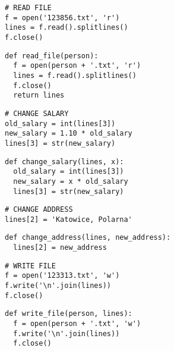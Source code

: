 \documentclass[aspectratio=169]{beamer}
\newcommand{\style}[1]{\ttfamily#1}
\begin{document}
\begin{frame}[fragile]
\begin{lstlisting}[basicstyle=\style{\small}]
# READ FILE
f = open('123856.txt', 'r')
lines = f.read().splitlines()
f.close()
\end{lstlisting}
\vspace{1.5cm}
\begin{lstlisting}[basicstyle=\style{\small}]
def read_file(person):
  f = open(person + '.txt', 'r')
  lines = f.read().splitlines()
  f.close()
  return lines
\end{lstlisting}
\end{frame}

\begin{frame}[fragile]
\begin{lstlisting}[basicstyle=\style{\small}]
# CHANGE SALARY
old_salary = int(lines[3])
new_salary = 1.10 * old_salary
lines[3] = str(new_salary)
\end{lstlisting}
\vspace{1.5cm}
\begin{lstlisting}[basicstyle=\style{\small}]
def change_salary(lines, x):
  old_salary = int(lines[3])
  new_salary = x * old_salary
  lines[3] = str(new_salary)
\end{lstlisting}
\end{frame}

\begin{frame}[fragile]
\begin{lstlisting}[basicstyle=\style{\small}]
# CHANGE ADDRESS
lines[2] = 'Katowice, Polarna'
\end{lstlisting}
\vspace{1.5cm}
\begin{lstlisting}[basicstyle=\style{\small}]
def change_address(lines, new_address):
  lines[2] = new_address
\end{lstlisting}
\end{frame}

\begin{frame}[fragile]
\begin{lstlisting}[basicstyle=\style{\small}]
# WRITE FILE
f = open('123313.txt', 'w')
f.write('\n'.join(lines))
f.close()
\end{lstlisting}
\vspace{1.5cm}
\begin{lstlisting}[basicstyle=\style{\small}]
def write_file(person, lines):
  f = open(person + '.txt', 'w')
  f.write('\n'.join(lines))
  f.close()
\end{lstlisting}
\end{frame}
\end{document}
